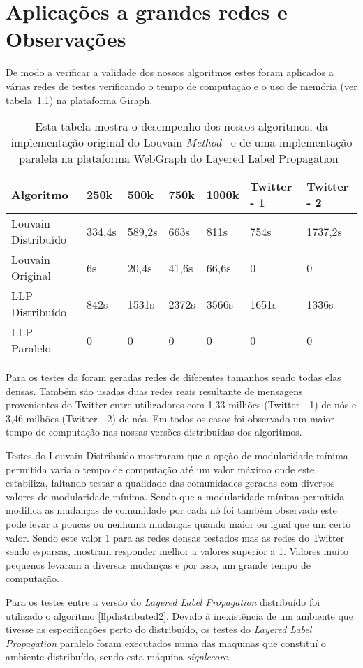 \chapter{Aplicações a grandes redes e Observações}
De modo a verificar a validade dos nossos algoritmos estes foram aplicados a 
várias redes de testes verificando o tempo de computação e o uso de memória (ver 
tabela~\ref{tbl:tm}) na plataforma Giraph.
\begin{table}
	\centering
 \begin{tabular}{|l|l|l|l|l|l|l|}
 \hline
			Algoritmo & 250k & 500k & 750k & 1000k & Twitter - 1 & Twitter - 2\\ \hline
			Louvain Distribuído&334,4s&589,2s&663s&811s&754s&1737,2s\\ \hline
			Louvain Original&6s&20,4s&41,6s&66,6s&0&0\\ \hline
			LLP Distribuído& 842s & 1531s & 2372s & 3566s & 1651s &	
1336s
\\ \hline
			LLP Paralelo&0&0&0&0&0&0 \\ \hline
		\end{tabular}
		\caption{Esta tabela mostra o desempenho dos nossos algoritmos,
		da implementação original do Louvain 
\textit{Method}~\cite{orgLouvain} e de uma implementação paralela na plataforma 
WebGraph do Layered Label Propagation~\cite{prlLLP}}
		\label{tbl:tm}
\end{table}

  Para os testes da foram geradas redes de diferentes tamanhos sendo todas 
elas densas. Também são usadas duas redes reais resultante de mensagens 
provenientes do Twitter entre utilizadores com 1,33 milhões (Twitter - 1) de nós 
e 3,46 milhões (Twitter - 2) de nós. Em todos os casos foi observado um maior 
tempo de computação nas nossas versões distribuídas dos algoritmos.

Testes do Louvain Distribuído mostraram que a opção de modularidade mínima 
permitida varia o tempo de computação até um valor máximo onde este estabiliza, 
faltando testar a qualidade das comunidades geradas com diversos valores de 
modularidade mínima. 
Sendo que a modularidade mínima permitida modifica as mudanças de comunidade
por cada nó foi também observado este pode levar a poucas ou nenhuma mudanças 
quando maior ou igual que um certo valor. Sendo este valor 1 para as redes 
densas testados mas as redes do Twitter sendo esparsas, mostram responder melhor 
a valores superior a 1. Valores muito pequenos levaram a diversas mudanças e por 
isso, um grande tempo de computação.

Para os testes entre a versão do \textit{Layered Label Propagation} distribuído 
foi utilizado o algoritmo \ref{llpdistributed2}. Devido à inexistência de um 
ambiente que tivesse as especificações perto do distribuído, os testes do 
\textit{Layered Label Propagation} paralelo foram executados numa das maquinas 
que constituí o ambiente distribuído, sendo esta máquina \textit{signlecore}.
